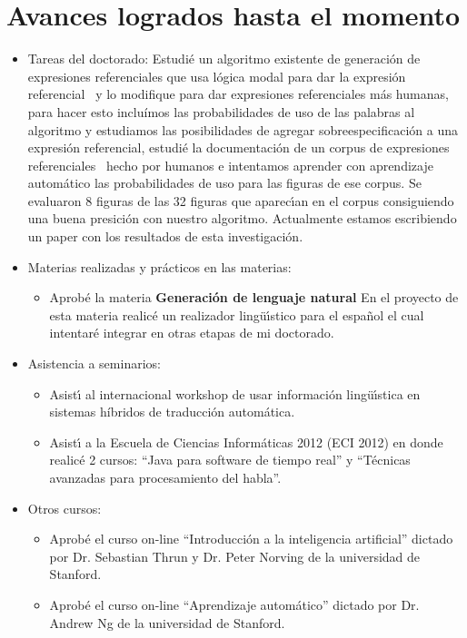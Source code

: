 \section{Avances logrados hasta el momento}
\label{progreso}

\begin{itemize}
\item Tareas del doctorado:
Estudi\'e un algoritmo existente de generaci\'on de expresiones referenciales que usa l\'ogica modal para dar la 
expresi\'on referencial~\cite{Areces2008} y lo modifique para dar expresiones referenciales m\'as humanas, para hacer 
esto inclu\'imos las probabilidades de uso de las palabras al algoritmo y estudiamos las posibilidades de agregar 
sobreespecificaci\'on a una expresi\'on referencial, estudi\'e la documentaci\'on de un corpus de expresiones 
referenciales~\cite{viethen-dale:2011:UCNLG+Eval} hecho por humanos e intentamos aprender con aprendizaje autom\'atico 
las probabilidades de uso para las figuras de ese corpus. Se evaluaron 8 figuras de las 32 figuras que aparec\'{\i}an en 
el corpus consiguiendo una buena presici\'on con nuestro algoritmo. Actualmente estamos escribiendo un paper con los resultados de esta investigaci\'on.

\item Materias realizadas y pr\'acticos en las materias:
\begin{itemize}
\item Aprob\'e la materia {\bf Generaci\'on de lenguaje natural} En el proyecto de esta materia realic\'e un realizador 
ling\"u\'{\i}stico para el espa\~{n}ol el cual intentar\'e integrar en otras etapas de mi doctorado.
\end{itemize}
\item Asistencia a seminarios:
\begin{itemize}
\item Asist\'{\i} al internacional workshop de usar informaci\'on ling\"u\'{\i}stica en sistemas h\'{i}bridos de traducci\'on autom\'atica.
\item Asist\'{\i} a la Escuela de Ciencias Inform\'aticas 2012 (ECI 2012) en donde realic\'e 2 cursos: ``Java para software de tiempo real''
y ``T\'ecnicas avanzadas para procesamiento del habla''.
\end{itemize}
\item Otros cursos:
\begin{itemize}
\item Aprob\'e el curso on-line ``Introducci\'on a la inteligencia artificial'' dictado por Dr. Sebastian Thrun y Dr. Peter Norving de la 
universidad de Stanford.
\item Aprob\'e el curso on-line ``Aprendizaje autom\'atico'' dictado por Dr. Andrew Ng de la universidad de Stanford. 
\end{itemize}

\end{itemize}




